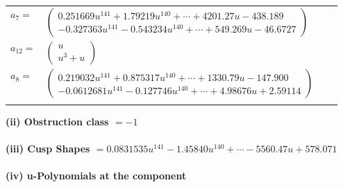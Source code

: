 \documentclass[1p]{elsarticle_modified}
\theoremstyle{definition}
\begin{document}
\begin{tabular}{m{7pt} m{180pt} m{7pt} m{180pt} }
\flushright $a_{7}=$&$\begin{pmatrix}0.251669 u^{141}+1.79219 u^{140}+\cdots+4201.27 u-438.189\\-0.327363 u^{141}-0.543234 u^{140}+\cdots+549.269 u-46.6727\end{pmatrix}$ \\
\flushright $a_{12}=$&$\begin{pmatrix}u\\u^3+u\end{pmatrix}$ \\
\flushright $a_{8}=$&$\begin{pmatrix}0.219032 u^{141}+0.875317 u^{140}+\cdots+1330.79 u-147.900\\-0.0612681 u^{141}-0.127746 u^{140}+\cdots+4.98676 u+2.59114\end{pmatrix}$\\&\end{tabular}
\flushleft \textbf{(ii) Obstruction class $= -1$}\\~\\
\flushleft \textbf{(iii) Cusp Shapes $= 0.0831535 u^{141}-1.45840 u^{140}+\cdots-5560.47 u+578.071$}\\~\\
\newpage\renewcommand{\arraystretch}{1}
\flushleft \textbf{(iv) u-Polynomials at the component}\newline \\
\end{document}
